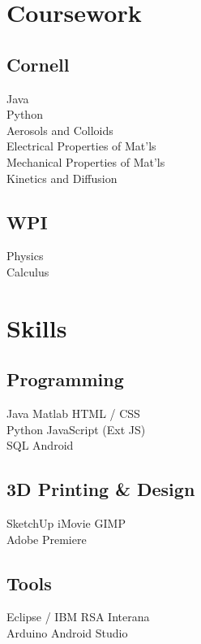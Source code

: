 \documentclass[]{jackie_loven_resume}
\begin{document}
\begin{minipage}[t]{0.33\textwidth}

\section{Coursework}
\subsection{Cornell}
Java \\
Python \\
Aerosols and Colloids \\
Electrical Properties of Mat'ls \\
Mechanical Properties of Mat'ls \\
Kinetics and Diffusion \\
\sectionsep

\subsection{WPI}
Physics \\
Calculus
\sectionsep


\section{Skills}
\subsection{Programming}
Java \textbullet{}  Matlab \textbullet{} HTML \//  CSS \\
Python \textbullet{} JavaScript (Ext JS)\\
SQL \textbullet{}  Android
\sectionsep


\subsection{3D Printing \& Design}
SketchUp \textbullet{} iMovie \textbullet{} GIMP \\
Adobe Premiere
\sectionsep

\subsection{Tools}
Eclipse \// IBM RSA \textbullet{} Interana \\
Arduino \textbullet{} Android Studio
\sectionsep



\end{minipage}
\end{document}

